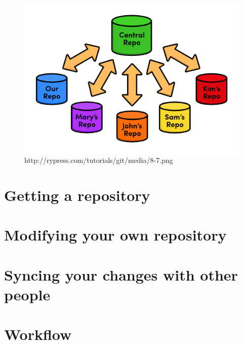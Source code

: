 \documentclass{beamer}
\begin{document}
\begin{frame}
\begin{figure}
\begin{center}
\includegraphics[scale=0.7]{centralised}
\caption{http://rypress.com/tutorials/git/media/8-7.png}
\end{center}
\end{figure}
\end{frame}

\section{Getting a repository}
\begin{frame}
\end{frame}

\section{Modifying your own repository}
\begin{frame}
\end{frame}

\section{Syncing your changes with other people}
\begin{frame}
\end{frame}

\section{Workflow}
\begin{frame}
\end{frame}
\end{document}
